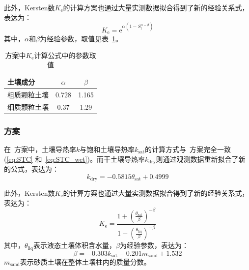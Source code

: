 此外，Kersten数$K_{\mathrm {e}} $的计算方案也通过大量实测数据拟合得到了新的经验关系式，表达为：
$$K_{\mathrm {e}} ={\mathrm e}^{\alpha\left(1-S_{\mathrm {r}} ^{\alpha-\beta}\right)}$$
其中，$\alpha$和$\beta$为经验参数，取值见表~\ref{tab:lu2007方案中Ke参数取值}。

{
  \begin{table}[htbp]
    \centering
    \caption{\citet{lu2007improved}方案中$K_{\mathrm {e}} $计算公式中的参数取值}
    \label{tab:lu2007方案中Ke参数取值}
    \begin{tabular}{@{}lcc@{}}
      \toprule
      土壤成分     & $\alpha$ & $\beta$ \\
      \midrule
      粗质颗粒土壤 & 0.728    & 1.165   \\
      细质颗粒土壤 & 0.37     & 1.29    \\
      \bottomrule
    \end{tabular}
  \end{table}
}


\subsubsection{\citet{Yan2019thermal}方案}
在~\citet{Yan2019thermal}方案中，土壤导热率$k$与饱和土壤导热率$k_{\mathrm{sat}}$的计算方式与~\citet{Johansen1975}方案完全一致 (\eqref{eq:STC} 和~\eqref{eq:STC_wet})。而干土壤导热率$k_{\mathrm{dry}}$则通过观测数据重新拟合了新的公式，表达为：
\begin{equation}\label{eq:STC_dry_Yan}
  k_{\mathrm{dry}}=-0.5815\theta_{\mathrm {sat}}  + 0.4999
\end{equation}

此外，Kersten数$K_{\mathrm {e}} $的计算方案也通过大量实测数据拟合得到了新的经验关系式，表达为：$$K_{\mathrm {e}} =\frac{1+\left(\frac{\theta_{\mathrm {sat}} }{\beta}\right)^{-\beta}}{1+\left(\frac{\theta_{\mathrm{liq}}}{\beta}\right)^{-\beta}}$$
其中，$\theta_{\mathrm{liq}}$表示液态土壤体积含水量，$\beta$为经验参数，表达为：$$\beta = -0.303k_{\mathrm{sat}} - 0.201m_{\mathrm{sand}} + 1.532$$
$m_{\mathrm{sand}}$表示砂质土壤在整体土壤柱内的质量分数。


